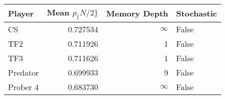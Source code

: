 \begin{tabular}{lrrl}
\toprule
   Player &  Mean $p_\{N/2\}$ &  Memory Depth & Stochastic \\
\midrule
       CS &        0.727534 &            \(\infty\) &      False \\
      TF2 &        0.711926 &             1 &      False \\
      TF3 &        0.711626 &             1 &      False \\
 Predator &        0.699933 &             9 &      False \\
 Prober 4 &        0.683730 &            \(\infty\) &      False \\
\bottomrule
\end{tabular}
